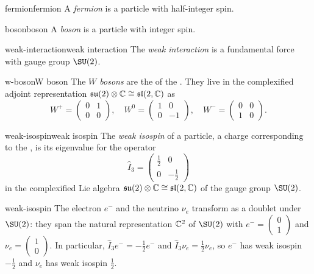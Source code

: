 \begin{topic}{fermion}{fermion}
    A \emph{fermion} is a particle with half-integer spin.
\end{topic}

\begin{topic}{boson}{boson}
    A \emph{boson} is a particle with integer spin.
\end{topic}

\begin{topic}{weak-interaction}{weak interaction}
    The \emph{weak interaction} is a fundamental force with gauge group $\SU(2)$.
\end{topic}

\begin{topic}{w-boson}{W boson}
    The \emph{$W$ bosons} are the  of the . They live in the complexified adjoint representation $\mathfrak{su}(2) \otimes \mathbb{C} \cong \mathfrak{sl}(2, \mathbb{C})$ as
    \[ W^+ = \begin{pmatrix} 0 & 1 \\ 0 & 0 \end{pmatrix}, \quad W^0 = \begin{pmatrix} 1 & 0 \\ 0 & -1 \end{pmatrix}, \quad W^- = \begin{pmatrix} 0 & 0 \\ 1 & 0 \end{pmatrix} . \]
\end{topic}

\begin{topic}{weak-isospin}{weak isospin}
    The \emph{weak isospin} of a particle, a charge corresponding to the , is its eigenvalue for the operator
    \[ \hat{I}_3 = \begin{pmatrix} \tfrac{1}{2} & 0 \\ 0 & - \tfrac{1}{2} \end{pmatrix} \]
    in the complexified Lie algebra $\mathfrak{su}(2) \otimes \mathbb{C} \cong \mathfrak{sl}(2, \mathbb{C})$ of the gauge group $\SU(2)$.
\end{topic}

\begin{example}{weak-isospin}
    The electron $e^-$ and the neutrino $\nu_e$ transform as a doublet under $\SU(2)$: they span the natural representation $\mathbb{C}^2$ of $\SU(2)$ with $e^- = \left( \begin{smallmatrix} 0 \\ 1 \end{smallmatrix} \right)$ and $\nu_e = \left( \begin{smallmatrix} 1 \\ 0 \end{smallmatrix} \right)$. In particular, $\hat{I}_3 e^- = -\tfrac{1}{2} e^-$ and $\hat{I}_3 \nu_e = \tfrac{1}{2} \nu_e$, so $e^-$ has weak isospin $-\tfrac{1}{2}$ and $\nu_e$ has weak isospin $\tfrac{1}{2}$.
\end{example}

